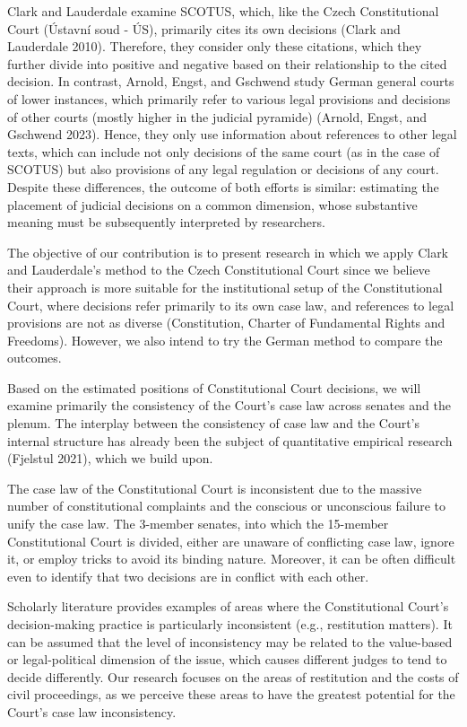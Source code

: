 \documentclass[
  11pt,
]{article}
\begin{document}
Clark and Lauderdale examine SCOTUS, which, like the Czech
Constitutional Court (Ústavní soud - ÚS), primarily cites its own
decisions (Clark and Lauderdale 2010). Therefore, they consider only
these citations, which they further divide into positive and negative
based on their relationship to the cited decision. In contrast, Arnold,
Engst, and Gschwend study German general courts of lower instances,
which primarily refer to various legal provisions and decisions of other
courts (mostly higher in the judicial pyramide) (Arnold, Engst, and
Gschwend 2023). Hence, they only use information about references to
other legal texts, which can include not only decisions of the same
court (as in the case of SCOTUS) but also provisions of any legal
regulation or decisions of any court. Despite these differences, the
outcome of both efforts is similar: estimating the placement of judicial
decisions on a common dimension, whose substantive meaning must be
subsequently interpreted by researchers.

The objective of our contribution is to present research in which we
apply Clark and Lauderdale's method to the Czech Constitutional Court
since we believe their approach is more suitable for the institutional
setup of the Constitutional Court, where decisions refer primarily to
its own case law, and references to legal provisions are not as diverse
(Constitution, Charter of Fundamental Rights and Freedoms). However, we
also intend to try the German method to compare the outcomes.

Based on the estimated positions of Constitutional Court decisions, we
will examine primarily the consistency of the Court's case law across
senates and the plenum. The interplay between the consistency of case
law and the Court's internal structure has already been the subject of
quantitative empirical research (Fjelstul 2021), which we build upon.

The case law of the Constitutional Court is inconsistent due to the
massive number of constitutional complaints and the conscious or
unconscious failure to unify the case law. The 3-member senates, into
which the 15-member Constitutional Court is divided, either are unaware
of conflicting case law, ignore it, or employ tricks to avoid its
binding nature. Moreover, it can be often difficult even to identify
that two decisions are in conflict with each other.

Scholarly literature provides examples of areas where the Constitutional
Court's decision-making practice is particularly inconsistent (e.g.,
restitution matters). It can be assumed that the level of inconsistency
may be related to the value-based or legal-political dimension of the
issue, which causes different judges to tend to decide differently. Our
research focuses on the areas of restitution and the costs of civil
proceedings, as we perceive these areas to have the greatest potential
for the Court's case law inconsistency.
\end{document}
